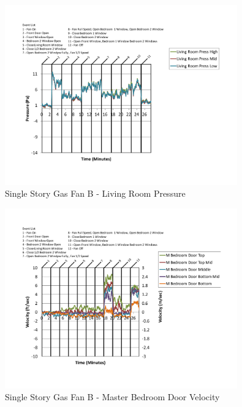 \documentclass{article}
\begin{document}
\begin{appendices}
	\begin{figure}[H]
		\centering
		\includegraphics[height=3.05in,trim=0.67in 1.1in 0.67in 0.8in,clip=true]{0_Images/Results_Charts/ColdFlow/Single_Story/Gas/B/Living_Room_Pressure.pdf}
		\caption{Single Story Gas Fan B - Living Room Pressure}
	\end{figure}
 

	\begin{figure}[H]
		\centering
		\includegraphics[height=3.05in,trim=0.67in 1.1in 0.67in 0.8in,clip=true]{0_Images/Results_Charts/ColdFlow/Single_Story/Gas/B/Master_Bedroom_Door_Velocity.pdf}
		\caption{Single Story Gas Fan B - Master Bedroom Door Velocity}
	\end{figure}
 
	\clearpage


\end{appendices}
\end{document}
